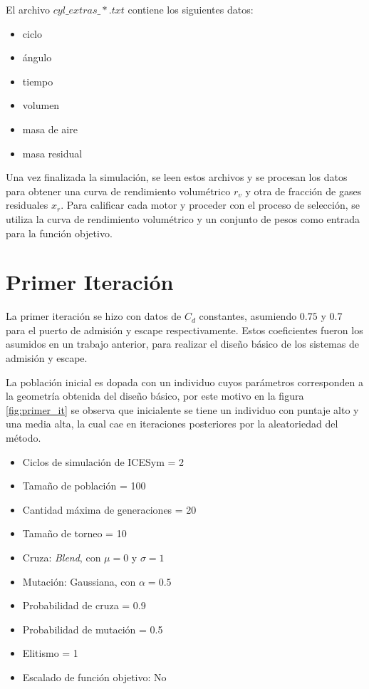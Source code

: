 El archivo \emph{$cyl\_extras\_*.txt$} contiene los siguientes datos:
\begin{itemize}
  \item ciclo
  \item ángulo
  \item tiempo
  \item volumen
  \item masa de aire
  \item masa residual
\end{itemize}

Una vez finalizada la simulación, se leen estos archivos y se procesan los datos
para obtener una curva de rendimiento volumétrico $r_{v}$ y otra de fracción de
gases residuales $x_{r}$.
%
Para calificar cada motor y proceder con el proceso de selección, se utiliza la
curva de rendimiento volumétrico y un conjunto de pesos como entrada para la
función objetivo.


\section{Primer Iteración}

La primer iteración se hizo con datos de $C_{d}$ constantes, asumiendo $0.75$ y
$0.7$ para el puerto de admisión y escape respectivamente.
%
Estos coeficientes fueron los asumidos en un trabajo anterior\cite{lopez13},
para realizar el diseño básico de los sistemas de admisión y escape.

La población inicial es dopada con un individuo cuyos parámetros corresponden a
la geometría obtenida del diseño básico\cite{lopez13}, por este motivo en la
figura \ref{fig:primer_it} se observa que inicialente se tiene un individuo con
puntaje alto y una media alta, la cual cae en iteraciones posteriores por la
aleatoriedad del método.

\begin{itemize}
        \item Ciclos de simulación de ICESym = 2
        \item Tamaño de población = 100
        \item Cantidad máxima de generaciones = 20
        \item Tamaño de torneo =  10
        \item Cruza: \emph{Blend}, con $\mu = 0$ y $\sigma = 1$
        \item Mutación: Gaussiana, con $\alpha = 0.5$
        \item Probabilidad de cruza = 0.9
        \item Probabilidad de mutación = 0.5
        \item Elitismo = 1
        \item Escalado de función objetivo: No
\end{itemize}

